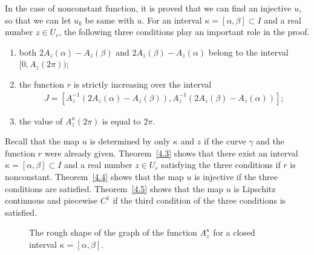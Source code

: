 \documentclass{amsart}
\theoremstyle{plain}
\theoremstyle{definition}
\theoremstyle{remark}
\begin{document}
In the case of nonconstant function, it is proved that we can find an injective $u$, so that we can let $u_k$ be same with $u$.
For an interval $\kappa=[\alpha,\beta]\subset I$ and a real number $z\in U_r$, the following three conditions play an important role in the proof.
\begin{enumerate}
\item both $2A_z(\alpha)-A_z(\beta)$ and $2A_z(\beta)-A_z(\alpha)$ belong to the interval $[0,A_z(2\pi))$;
\item the function $r$ is strictly increasing over the interval 
\begin{align*}
J=[A_z^{-1}(2A_z(\alpha)-A_z(\beta)),A_z^{-1}(2A_z(\beta)-A_z(\alpha))];
\end{align*}
\item the value of $A_z^{\kappa}(2\pi)$ is equal to $2\pi$.
\end{enumerate}
Recall that the map $u$ is determined by only $\kappa$ and $z$ if the curve $\gamma$ and the function $r$ were already given.
Theorem~\ref{4.3} shows that there exist an interval $\kappa=[\alpha,\beta]\subset I$ and a real number $z\in U_r$ satisfying the three conditions if $r$ is nonconstant.
Theorem~\ref{4.4} shows that the map $u$ is injective if the three conditions are satisfied.
Theorem~\ref{4.5} shows that the map $u$ is Lipschitz continuous and piecewise $C^1$ if the third condition of the three conditions is satisfied.



\begin{figure}[h]%
\caption{The rough shape of the graph of the function $A_z^{\kappa}$ for a closed interval $\kappa=[\alpha,\beta]$.}
\end{figure}
\end{document}
